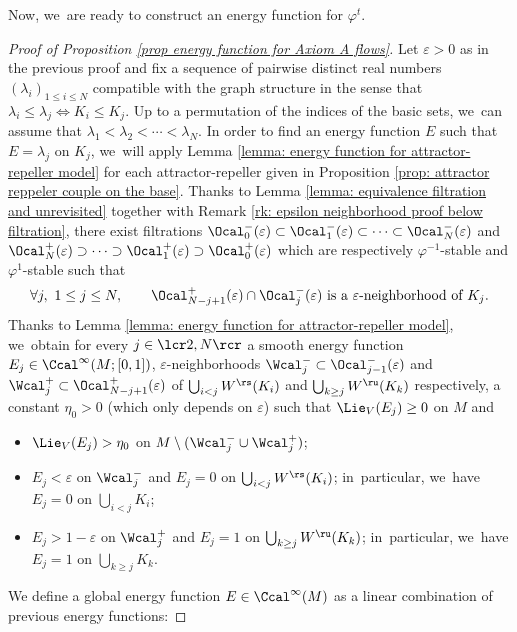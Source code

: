 Now, we~are ready to construct an energy function for $\varphi^t$.

\begin{proof}[Proof of Proposition \ref{prop energy function for Axiom A flows}]
Let $\varepsilon > 0$ as in the previous proof and fix a sequence of pairwise distinct real numbers $(\lambda_i)_{1 \leq i \leq N}$ compatible with the graph structure in the sense that $\lambda_i \leq \lambda_j \Leftrightarrow K_i \leq K_j$. Up to a permutation of the indices of the basic sets, we~can assume that $\lambda_1 < \lambda_2 < \cdots < \lambda_N$.
In order to find an energy function $E$ such that $E = \lambda_j$ on $K_j$, we~will apply Lemma \ref{lemma: energy function for attractor-repeller model} for each attractor-repeller given in Proposition \ref{prop: attractor reppeler couple on the base}. Thanks to Lemma \ref{lemma: equivalence filtration and unrevisited} together with Remark \ref{rk: epsilon neighborhood proof below filtration}, there exist filtrations $\Ocal_0^- (\varepsilon) \subset \Ocal_1^- (\varepsilon) \subset \cdots \subset \Ocal_{N}^- (\varepsilon)$ and $\Ocal_N^+ (\varepsilon) \supset \cdots \supset \Ocal_{1}^+ (\varepsilon) \supset \Ocal_0^+ (\varepsilon)$ which are respectively $\varphi^{-1}$-stable and $\varphi^{1}$-stable such that
\[
\forall j,\ 1 \leq j \leq N, \qquad \Ocal_{N-j+1}^+ (\varepsilon) \cap \Ocal_{j}^- (\varepsilon) \text{ is a } \varepsilon \text{-neighborhood of } K_j.
\]
Thanks to Lemma \ref{lemma: energy function for attractor-repeller model}, we~obtain for every $j\in\lcr2,N\rcr$ a smooth energy function $E_{j} \in \Ccal^{\infty} (M; [0,1])$, $\varepsilon$-neighborhoods $\Wcal_{j}^- \subset \Ocal_{j-1}^- (\varepsilon)$ and $\Wcal_{j}^+ \subset \Ocal_{N-j+1}^+ (\varepsilon)$ of $ \bigcup_{i < j} W^\rs (K_i)$ and $ \bigcup_{k \geq j} W^\ru (K_k)$ respectively, a constant $\eta_0 > 0$ (which only depends on $\varepsilon$) such that $\Lie_V (E_j) \geq 0$ on $M$ and
\begin{itemize}
\item $\Lie_V (E_j) > \eta_0$ on $M\setminus (\Wcal_j^- \cup \Wcal_j^+)$;
\item $E_j < \varepsilon$ on $\Wcal_j^-$ and $E_j = 0$ on $\bigcup_{i < j} W^\rs (K_i)$; in~particular, we~have $E_j = 0$ on $\bigcup_{i < j} K_i$;
\item $E_j > 1 - \varepsilon$ on $\Wcal_j^+$ and $E_j = 1$ on $\bigcup_{k \geq j} W^\ru (K_k)$; in~particular, we~have $E_j = 1$ on $\bigcup_{k \geq j} K_k$.
\end{itemize}
We define a global energy function $E \in \Ccal^{\infty} (M)$ as a linear combination of previous energy functions:

\end{proof}
